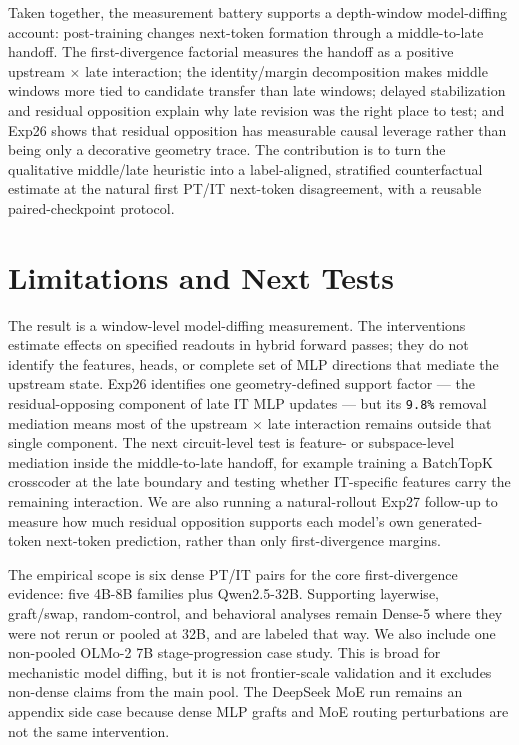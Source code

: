 \documentclass[11pt]{article}
\begin{document}
Taken together, the measurement battery supports a depth-window model-diffing account: post-training changes next-token formation through a middle-to-late handoff. The first-divergence factorial measures the handoff as a positive upstream \ensuremath{\times} late interaction; the identity/margin decomposition makes middle windows more tied to candidate transfer than late windows; delayed stabilization and residual opposition explain why late revision was the right place to test; and Exp26 shows that residual opposition has measurable causal leverage rather than being only a decorative geometry trace. The contribution is to turn the qualitative middle/late heuristic into a label-aligned, stratified counterfactual estimate at the natural first PT/IT next-token disagreement, with a reusable paired-checkpoint protocol.

\section{Limitations and Next Tests}

The result is a window-level model-diffing measurement. The interventions estimate effects on specified readouts in hybrid forward passes; they do not identify the features, heads, or complete set of MLP directions that mediate the upstream state. Exp26 identifies one geometry-defined support factor --- the residual-opposing component of late IT MLP updates --- but its \texttt{9.8\%} removal mediation means most of the upstream \ensuremath{\times} late interaction remains outside that single component. The next circuit-level test is feature- or subspace-level mediation inside the middle-to-late handoff, for example training a BatchTopK crosscoder at the late boundary and testing whether IT-specific features carry the remaining interaction. We are also running a natural-rollout Exp27 follow-up to measure how much residual opposition supports each model's own generated-token next-token prediction, rather than only first-divergence margins.

The empirical scope is six dense PT/IT pairs for the core first-divergence evidence: five 4B-8B families plus Qwen2.5-32B. Supporting layerwise, graft/swap, random-control, and behavioral analyses remain Dense-5 where they were not rerun or pooled at 32B, and are labeled that way. We also include one non-pooled OLMo-2 7B stage-progression case study. This is broad for mechanistic model diffing, but it is not frontier-scale validation and it excludes non-dense claims from the main pool. The DeepSeek MoE run remains an appendix side case because dense MLP grafts and MoE routing perturbations are not the same intervention.
\end{document}
